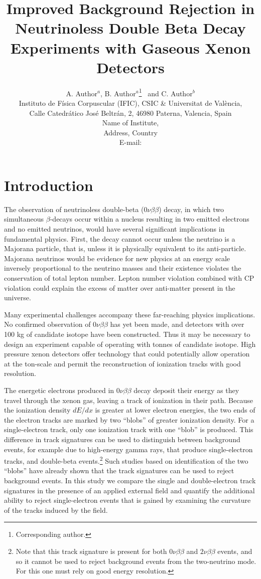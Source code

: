 \documentclass{JINST}
\title{Improved Background Rejection in Neutrinoless Double Beta Decay Experiments with Gaseous Xenon Detectors}
\author{A. Author$^a$,
B. Author$^a$\thanks{Corresponding author.}~
and C. Author$^b$\\
\llap{$^a$}Instituto de F\'isica Corpuscular (IFIC), CSIC \& Universitat de Val\`encia,\\ 
Calle Catedr\'atico Jos\'e Beltr\'an, 2, 46980 Paterna, Valencia, Spain\\
\llap{$^b$}Name of Institute,\\
  Address, Country\\
E-mail: \email{CorrespondingAuthor@email.com}}
\begin{document}
\section{Introduction}\label{sec:intro}
The observation of neutrinoless double-beta ($0\nu\beta\beta$) decay, in which two simultaneous $\beta$-decays occur within a nucleus resulting in two emitted electrons and no emitted neutrinos, would have several significant implications in fundamental physics.  First, the decay cannot occur unless the neutrino is a Majorana particle, that is, unless it is physically equivalent to its anti-particle.  Majorana neutrinos would be evidence for new physics at an energy scale inversely proportional to the neutrino masses and their existence violates the conservation of total lepton number.  Lepton number violation combined with CP violation could explain the excess of matter over anti-matter present in the universe.

Many experimental challenges accompany these far-reaching physics implications.  No confirmed observation of $0\nu\beta\beta$ has yet been made, and detectors with over 100 kg of candidate isotope have been constructed.  Thus it may be necessary to design an experiment capable of operating with tonnes of candidate isotope.  High pressure xenon detectors offer technology that could potentially allow operation at the ton-scale and permit the reconstruction of ionization tracks with good resolution.  

The energetic electrons produced in $0\nu\beta\beta$ decay deposit their energy as they travel through the xenon gas,
leaving a track of ionization in their path.  Because the ionization density $dE/dx$ is greater at lower electron energies,
the two ends of the electron tracks are marked by two ``blobs'' of greater ionization density.  For a single-electron
track, only one ionization track with one ``blob'' is produced.  This difference in track signatures can be used to
distinguish between background events, for example due to high-energy gamma rays, that produce single-electron
tracks, and double-beta events.\footnote{Note that this track signature is present for both $0\nu\beta\beta$ and
$2\nu\beta\beta$ events, and so it cannot be used to reject background events from the two-neutrino mode.  For this
one must rely on good energy resolution.}  Such studies based on identification of the two ``blobs'' have already shown
that the track signatures can be used to reject background events.  In this study we compare the single and
double-electron track signatures in the presence of an applied external field and quantify the additional ability to 
reject single-electron events that is gained by examining the curvature of the tracks induced by the field.
\end{document}
